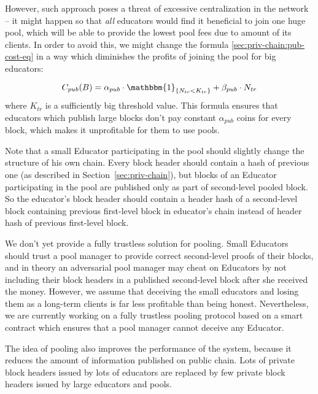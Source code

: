 However, such approach poses a threat of excessive centralization in the network
-- it might happen so that \textit{all} educators would find it beneficial to
join one huge pool, which will be able to provide the lowest pool fees due to
amount of its clients. In order to avoid this, we might change the formula
\ref{sec:priv-chain:pub-cost-eq} in a way which diminishes the profits of
joining the pool for big educators:

\begin{equation}\label{apx:pools:poosl-cost-eq-2}
  C_{pub}(B) = \alpha_{pub} \cdot \mathbbm{1}_{\{N_{tr} < K_{tr}\}} + \beta_{pub}
  \cdot N_{tr}
\end{equation}
where $K_{tr}$ is a sufficiently big threshold value. This formula ensures that
educators which publish large blocks don't pay constant $\alpha_{pub}$ coins for
every block, which makes it unprofitable for them to use pools.

Note that a small Educator participating in the pool should slightly change the
structure of his own chain. Every block header should contain a hash of previous
one (as described in Section~\ref{sec:priv-chain}), but blocks of an Educator
participating in the pool are published only as part of second-level pooled
block. So the educator's block header should contain a header hash of a
second-level block containing previous first-level block in educator's chain
instead of header hash of previous first-level block.

We don't yet provide a fully trustless solution for pooling. Small Educators
should trust a pool manager to provide correct second-level proofs of their
blocks, and in theory an adversarial pool manager may cheat on Educators by not
including their block headers in a published second-level block after she
received the money. However, we assume that deceiving the small educators and
losing them as a long-term clients is far less profitable than being honest.
Nevertheless, we are currently working on a fully trustless pooling protocol
based on a smart contract which ensures that a pool manager cannot deceive any
Educator.

The idea of pooling also improves the performance of the system, because it
reduces the amount of information published on public chain. Lots of private
block headers issued by lots of educators are replaced by few private block
headers issued by large educators and pools.

